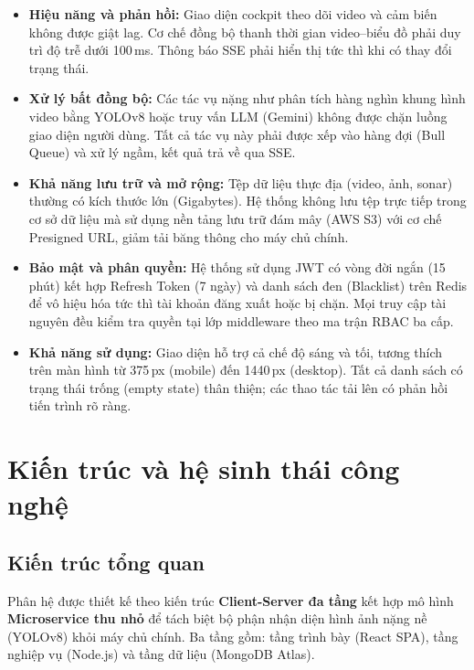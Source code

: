 \documentclass[../DoAn.tex]{subfiles}
\begin{document}
\begin{itemize}[leftmargin=*, topsep=4pt, itemsep=4pt]
  \item \textbf{Hiệu năng và phản hồi:} Giao diện cockpit theo dõi video và cảm biến không được giật lag. Cơ chế đồng bộ thanh thời gian video--biểu đồ phải duy trì độ trễ dưới 100\,ms. Thông báo SSE phải hiển thị tức thì khi có thay đổi trạng thái.

  \item \textbf{Xử lý bất đồng bộ:} Các tác vụ nặng như phân tích hàng nghìn khung hình video bằng YOLOv8 hoặc truy vấn LLM (Gemini) không được chặn luồng giao diện người dùng. Tất cả tác vụ này phải được xếp vào hàng đợi (Bull Queue) và xử lý ngầm, kết quả trả về qua SSE.

  \item \textbf{Khả năng lưu trữ và mở rộng:} Tệp dữ liệu thực địa (video, ảnh, sonar) thường có kích thước lớn (Gigabytes). Hệ thống không lưu tệp trực tiếp trong cơ sở dữ liệu mà sử dụng nền tảng lưu trữ đám mây (AWS S3) với cơ chế Presigned URL, giảm tải băng thông cho máy chủ chính.

  \item \textbf{Bảo mật và phân quyền:} Hệ thống sử dụng JWT có vòng đời ngắn (15 phút) kết hợp Refresh Token (7 ngày) và danh sách đen (Blacklist) trên Redis để vô hiệu hóa tức thì tài khoản đăng xuất hoặc bị chặn. Mọi truy cập tài nguyên đều kiểm tra quyền tại lớp middleware theo ma trận RBAC ba cấp.

  \item \textbf{Khả năng sử dụng:} Giao diện hỗ trợ cả chế độ sáng và tối, tương thích trên màn hình từ 375\,px (mobile) đến 1440\,px (desktop). Tất cả danh sách có trạng thái trống (empty state) thân thiện; các thao tác tải lên có phản hồi tiến trình rõ ràng.
\end{itemize}

\section{Kiến trúc và hệ sinh thái công nghệ}
\label{section:7.2}

\subsection{Kiến trúc tổng quan}

Phân hệ được thiết kế theo kiến trúc \textbf{Client-Server đa tầng} kết hợp mô hình \textbf{Microservice thu nhỏ} để tách biệt bộ phận nhận diện hình ảnh nặng nề (YOLOv8) khỏi máy chủ chính. Ba tầng gồm: tầng trình bày (React SPA), tầng nghiệp vụ (Node.js) và tầng dữ liệu (MongoDB Atlas).
\end{document}
